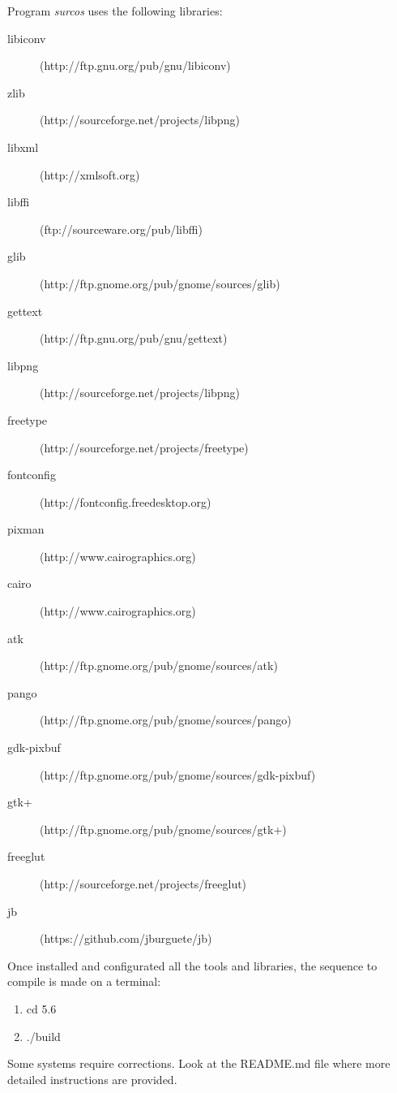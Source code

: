 Program \emph{surcos} uses the following libraries:
\begin{description}
\item[libiconv] (http://ftp.gnu.org/pub/gnu/libiconv)
\item[zlib] (http://sourceforge.net/projects/libpng)
\item[libxml] (http://xmlsoft.org)
\item[libffi] (ftp://sourceware.org/pub/libffi)
\item[glib] (http://ftp.gnome.org/pub/gnome/sources/glib)
\item[gettext] (http://ftp.gnu.org/pub/gnu/gettext)
\item[libpng] (http://sourceforge.net/projects/libpng)
\item[freetype] (http://sourceforge.net/projects/freetype)
\item[fontconfig] (http://fontconfig.freedesktop.org)
\item[pixman] (http://www.cairographics.org)
\item[cairo] (http://www.cairographics.org)
\item[atk] (http://ftp.gnome.org/pub/gnome/sources/atk)
\item[pango] (http://ftp.gnome.org/pub/gnome/sources/pango)
\item[gdk-pixbuf] (http://ftp.gnome.org/pub/gnome/sources/gdk-pixbuf)
\item[gtk+] (http://ftp.gnome.org/pub/gnome/sources/gtk+)
\item[freeglut] (http://sourceforge.net/projects/freeglut)
\item[jb] (https://github.com/jburguete/jb)
\end{description}

Once installed and configurated all the tools and libraries, the sequence to compile is made on a terminal:

\begin{enumerate}
\item cd 5.6
\item ./build
\end{enumerate}
Some systems require corrections. Look at the README.md file where more detailed instructions are provided.  

